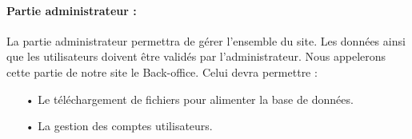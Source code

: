 \paragraph{Partie administrateur :} La partie administrateur permettra de gérer l'ensemble du site. Les données ainsi que les utilisateurs doivent être validés par l'administrateur. Nous appelerons cette partie de notre site le Back-office. Celui devra permettre :
\begin{enumerate}
\item[•] Le téléchargement de fichiers pour alimenter la base de données.
\item[•] La gestion des comptes utilisateurs.
\end{enumerate}